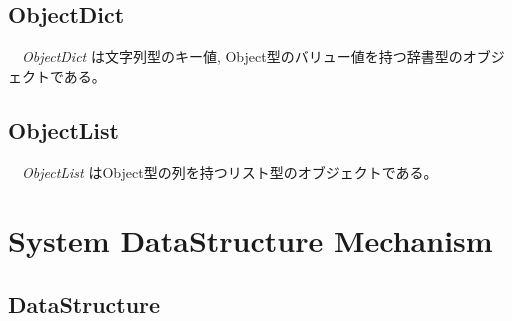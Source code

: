 \hypertarget{objectdict}{%
\subsection{ObjectDict}\label{objectdict}}

　\emph{ObjectDict} は文字列型のキー値,
Object型のバリュー値を持つ辞書型のオブジェクトである。

\hypertarget{objectlist}{%
\subsection{ObjectList}\label{objectlist}}

　\emph{ObjectList} はObject型の列を持つリスト型のオブジェクトである。

\hypertarget{system-datastructure-mechanism}{%
\section{System DataStructure
Mechanism}\label{system-datastructure-mechanism}}

\hypertarget{datastructure}{%
\subsection{DataStructure}\label{datastructure}}


